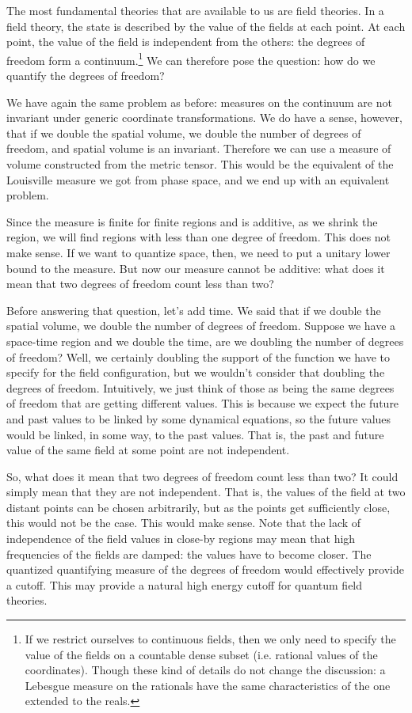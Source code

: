 \documentclass[10pt,twocolumn, nofootinbib]{revtex4-2}
\begin{document}
The most fundamental theories that are available to us are field theories. In a field theory, the state is described by the value of the fields at each point. At each point, the value of the field is independent from the others: the degrees of freedom form a continuum.\footnote{If we restrict ourselves to continuous fields, then we only need to specify the value of the fields on a countable dense subset (i.e. rational values of the coordinates). Though these kind of details do not change the discussion: a Lebesgue measure on the rationals have the same characteristics of the one extended to the reals.} We can therefore pose the question: how do we quantify the degrees of freedom?

We have again the same problem as before: measures on the continuum are not invariant under generic coordinate transformations. We do have a sense, however, that if we double the spatial volume, we double the number of degrees of freedom, and spatial volume is an invariant. Therefore we can use a measure of volume constructed from the metric tensor. This would be the equivalent of the Louisville measure we got from phase space, and we end up with an equivalent problem.

Since the measure is finite for finite regions and is additive, as we shrink the region, we will find regions with less than one degree of freedom. This does not make sense. If we want to quantize space, then, we need to put a unitary lower bound to the measure. But now our measure cannot be additive: what does it mean that two degrees of freedom count less than two?

Before answering that question, let's add time. We said that if we double the spatial volume, we double the number of degrees of freedom. Suppose we have a space-time region and we double the time, are we doubling the number of degrees of freedom? Well, we certainly doubling the support of the function we have to specify for the field configuration, but we wouldn't consider that doubling the degrees of freedom. Intuitively, we just think of those as being the same degrees of freedom that are getting different values. This is because we expect the future and past values to be linked by some dynamical equations, so the future values would be linked, in some way, to the past values. That is, the past and future value of the same field at some point are not independent.

So, what does it mean that two degrees of freedom count less than two? It could simply mean that they are not independent. That is, the values of the field at two distant points can be chosen arbitrarily, but as the points get sufficiently close, this would not be the case. This would make sense. Note that the lack of independence of the field values in close-by regions may mean that high frequencies of the fields are damped: the values have to become closer. The quantized quantifying measure of the degrees of freedom would effectively provide a cutoff. This may provide a natural high energy cutoff for quantum field theories.
\end{document}

